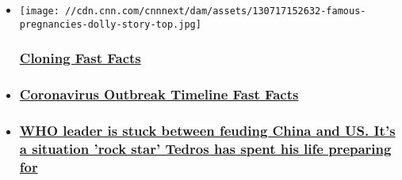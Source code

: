 \begin{itemize}
\item
  \href{/2013/10/30/health/cloning-fast-facts/index.html}{}

  \texttt{[image: //cdn.cnn.com/cnnnext/dam/assets/130717152632-famous-pregnancies-dolly-story-top.jpg]}

  \hypertarget{cloning-fast-facts}{%
  \subsubsection{\texorpdfstring{\href{/2013/10/30/health/cloning-fast-facts/index.html}{Cloning
  Fast Facts}}{Cloning Fast Facts}}\label{cloning-fast-facts}}
\item
  \hypertarget{coronavirus-outbreak-timeline-fast-facts}{%
  \subsubsection{\texorpdfstring{\href{/2020/02/06/health/wuhan-coronavirus-timeline-fast-facts/index.html}{Coronavirus
  Outbreak Timeline Fast
  Facts}}{Coronavirus Outbreak Timeline Fast Facts}}\label{coronavirus-outbreak-timeline-fast-facts}}
\item
  \hypertarget{who-leader-is-stuck-between-feuding-china-and-us-its-a-situation-rock-star-tedros-has-spent-his-life-preparing-for}{%
  \subsubsection{\texorpdfstring{\href{/2020/08/01/health/who-is-tedros-adhanom-ghebreyesus-intl/index.html}{WHO
  leader is stuck between feuding China and US. It's a situation 'rock
  star' Tedros has spent his life preparing
  for}}{WHO leader is stuck between feuding China and US. It's a situation 'rock star' Tedros has spent his life preparing for}}\label{who-leader-is-stuck-between-feuding-china-and-us-its-a-situation-rock-star-tedros-has-spent-his-life-preparing-for}}
\end{itemize}

